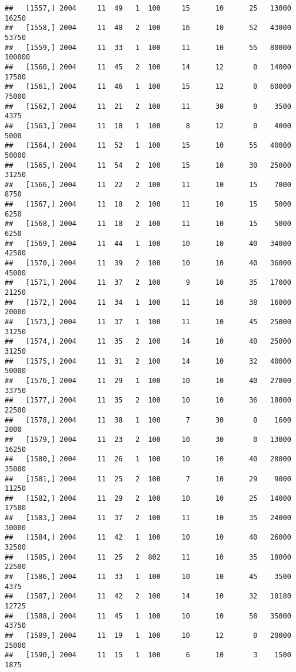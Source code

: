 \documentclass{article}\usepackage[]{graphicx}\usepackage[]{color}
\makeatletter
\newenvironment{kframe}{%
 \def\at@end@of@kframe{}%
 \ifinner\ifhmode%
  \def\at@end@of@kframe{\end{minipage}}%
  \begin{minipage}{\columnwidth}%
 \fi\fi%
 \def\FrameCommand##1{\hskip\@totalleftmargin \hskip-\fboxsep
 \colorbox{shadecolor}{##1}\hskip-\fboxsep
     \hskip-\linewidth \hskip-\@totalleftmargin \hskip\columnwidth}%
 \MakeFramed {\advance\hsize-\width
   \@totalleftmargin\z@ \linewidth\hsize
   \@setminipage}}%
 {\par\unskip\endMakeFramed%
 \at@end@of@kframe}
\newenvironment{knitrout}{}{} %
\makeatother
\begin{document}
\begin{knitrout}
\begin{kframe}
\begin{verbatim}
##   [1557,] 2004     11  49   1  100     15      10      25   13000   16250
##   [1558,] 2004     11  48   2  100     16      10      52   43000   53750
##   [1559,] 2004     11  33   1  100     11      10      55   80000  100000
##   [1560,] 2004     11  45   2  100     14      12       0   14000   17500
##   [1561,] 2004     11  46   1  100     15      12       0   60000   75000
##   [1562,] 2004     11  21   2  100     11      30       0    3500    4375
##   [1563,] 2004     11  18   1  100      8      12       0    4000    5000
##   [1564,] 2004     11  52   1  100     15      10      55   40000   50000
##   [1565,] 2004     11  54   2  100     15      10      30   25000   31250
##   [1566,] 2004     11  22   2  100     11      10      15    7000    8750
##   [1567,] 2004     11  18   2  100     11      10      15    5000    6250
##   [1568,] 2004     11  18   2  100     11      10      15    5000    6250
##   [1569,] 2004     11  44   1  100     10      10      40   34000   42500
##   [1570,] 2004     11  39   2  100     10      10      40   36000   45000
##   [1571,] 2004     11  37   2  100      9      10      35   17000   21250
##   [1572,] 2004     11  34   1  100     11      10      38   16000   20000
##   [1573,] 2004     11  37   1  100     11      10      45   25000   31250
##   [1574,] 2004     11  35   2  100     14      10      40   25000   31250
##   [1575,] 2004     11  31   2  100     14      10      32   40000   50000
##   [1576,] 2004     11  29   1  100     10      10      40   27000   33750
##   [1577,] 2004     11  35   2  100     10      10      36   18000   22500
##   [1578,] 2004     11  38   1  100      7      30       0    1600    2000
##   [1579,] 2004     11  23   2  100     10      30       0   13000   16250
##   [1580,] 2004     11  26   1  100     10      10      40   28000   35000
##   [1581,] 2004     11  25   2  100      7      10      29    9000   11250
##   [1582,] 2004     11  29   2  100     10      10      25   14000   17500
##   [1583,] 2004     11  37   2  100     11      10      35   24000   30000
##   [1584,] 2004     11  42   1  100     10      10      40   26000   32500
##   [1585,] 2004     11  25   2  802     11      10      35   18000   22500
##   [1586,] 2004     11  33   1  100     10      10      45    3500    4375
##   [1587,] 2004     11  42   2  100     14      10      32   10180   12725
##   [1588,] 2004     11  45   1  100     10      10      58   35000   43750
##   [1589,] 2004     11  19   1  100     10      12       0   20000   25000
##   [1590,] 2004     11  15   1  100      6      10       3    1500    1875

\end{verbatim}
\end{kframe}
\end{knitrout}
\end{document}
